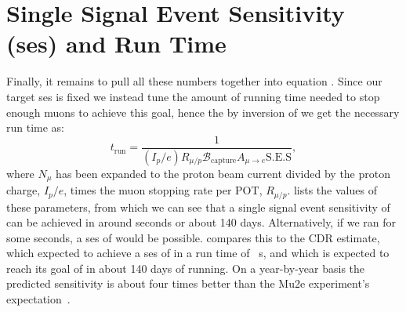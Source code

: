 \section{Single Signal Event Sensitivity (\acs{ses}) and Run Time}
Finally, it remains to pull all these numbers together into equation .
Since our target \ac{ses} is fixed we instead tune the amount of running time needed to stop enough muons to achieve this goal, hence the by inversion of  we get the necessary run time as:
\begin{equation}
        t_\textrm{run}=\frac{1}{(I_p/e){R}_{\mu/p}\mathcal{B}_\mathrm{capture} A_{\mu\rightarrow e}\mathrm{S.E.S}},
\end{equation}
where $N_\mu$ has been expanded to the proton beam current divided by the proton charge, $I_p/e$, times the muon stopping rate per \ac{POT}, $R_{\mu/p}$.
 lists the values of these parameters, from which we can see that a single signal event sensitivity of \sensePII can be achieved in around  seconds or about 140 days.
Alternatively, if we ran for some  seconds, a \acf{ses} of  would be possible.
 compares this to the CDR estimate, which expected to achieve a \ac{ses} of  in a run time of ~s, and \phaseI which is expected to reach its goal of \sensePI in about 140 days of running.
On a year-by-year basis the predicted \phaseII sensitivity is about four times better than the Mu2e experiment's expectation~\cite{Mu2e2014}. 

